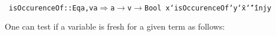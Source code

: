 \documentclass[9pt,authoryear]{sigplanconf}
\begin{document}
%
%
%
~\\~\vphantom{$\{$}\texttt{isOccurenceOf}\texttt{\mbox{\hspace{0.50em}}}\texttt{{:}{:}}\texttt{\mbox{\hspace{0.50em}}}\texttt{\makebox[1.22ex][l]{$ {(} $}}\texttt{Eq}\texttt{\mbox{\hspace{0.50em}}}\texttt{a,}\texttt{\mbox{\hspace{0.50em}}}\texttt{v}\texttt{\mbox{\hspace{0.50em}}}\texttt{\makebox[1.22ex][c]{$ \in $}}\texttt{\mbox{\hspace{0.50em}}}\texttt{a}\texttt{\makebox[1.22ex][r]{$ {)} $}}\texttt{\mbox{\hspace{0.50em}}}\texttt{$ \Rightarrow $}\texttt{\mbox{\hspace{0.50em}}}\texttt{a}\texttt{\mbox{\hspace{0.50em}}}\texttt{$ \rightarrow $}\texttt{\mbox{\hspace{0.50em}}}\texttt{v}\texttt{\mbox{\hspace{0.50em}}}\texttt{$ \rightarrow $}\texttt{\mbox{\hspace{0.50em}}}\texttt{Bool}\texttt{{\nopagebreak \newline%
}\vphantom{$\{$}}\texttt{x}\texttt{\mbox{\hspace{0.50em}}}\texttt{{`}isOccurenceOf{`}}\texttt{\mbox{\hspace{0.50em}}}\texttt{y}\texttt{\mbox{\hspace{0.50em}}}\texttt{{\char `\=}}\texttt{\mbox{\hspace{0.50em}}}\texttt{x}\texttt{\mbox{\hspace{0.50em}}}\texttt{{\char `\=}{\char `\=}}\texttt{\mbox{\hspace{0.50em}}}\texttt{inj}\texttt{\mbox{\hspace{0.50em}}}\texttt{y}\texttt{{\nopagebreak \newline%
}\vphantom{$\{$}}%


%
One can test if a variable is fresh for a given term as follows{:}%


{\nopagebreak }
\end{document}
